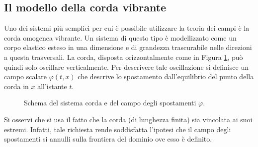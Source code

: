 \subsection{Il modello della corda vibrante}
Uno dei sistemi più semplici per cui è possibile utilizzare la teoria dei campi è la corda omogenea vibrante. Un sistema di questo tipo è modellizzato come un corpo elastico esteso in una dimensione e di grandezza trascurabile nelle direzioni a questa trasversali. La corda, disposta orizzontalmente come in Figura \ref{fig:corda}, può quindi solo oscillare verticalmente. Per descrivere tale oscillazione si definisce un campo scalare $\varphi(t,x)$ che descrive lo spostamento dall'equilibrio del punto della corda in $x$ all'istante $t$.
\begin{figure}[H]
    \centering
    \caption{Schema del sistema corda e del campo degli spostamenti $\varphi$.}
    \label{fig:corda}
\end{figure} 
Si osservi che si usa il fatto che la corda (di lunghezza finita) sia vincolata ai suoi estremi. Infatti, tale richiesta rende soddisfatta l'ipotesi che il campo degli spostamenti si annulli sulla frontiera del dominio ove esso è definito. \\


